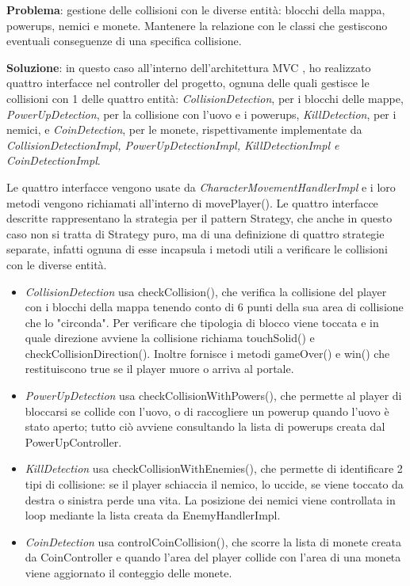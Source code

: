\documentclass[a4paper,12pt]{report}
\begin{document}
\textbf{Problema}: gestione delle collisioni con le diverse entità: blocchi della mappa, powerups, nemici e monete. 
Mantenere la relazione con le classi che gestiscono eventuali conseguenze di una specifica collisione.\vspace{1cm}

\textbf{Soluzione}: in questo caso all'interno dell'architettura MVC , ho realizzato quattro interfacce nel controller del progetto, 
ognuna delle quali gestisce le collisioni con 1 delle quattro entità: \emph{CollisionDetection}, per i blocchi delle mappe, \emph{PowerUpDetection}, 
per la collisione con l'uovo e i powerups, \emph{KillDetection}, per i nemici, e \emph{CoinDetection}, per le monete, 
rispettivamente implementate da \emph{CollisionDetectionImpl, PowerUpDetectionImpl, KillDetectionImpl e CoinDetectionImpl}.

Le quattro interfacce vengono usate da \emph{CharacterMovementHandlerImpl} e i loro metodi vengono richiamati all'interno di movePlayer().
Le quattro interfacce descritte rappresentano la strategia per il pattern Strategy, che anche in questo caso non si tratta di Strategy puro, 
ma di una definizione di quattro strategie separate, infatti ognuna di esse incapsula i metodi utili a verificare le collisioni con le 
diverse entità.

\begin{itemize}
    \item \emph{CollisionDetection} usa checkCollision(), che verifica la collisione del player con i blocchi della mappa tenendo conto di 6 punti 
    della sua area di collisione che lo "circonda". Per verificare che tipologia di blocco viene toccata e in quale direzione avviene
    la collisione richiama touchSolid() e checkCollisionDirection().
    Inoltre fornisce i metodi gameOver() e win() che restituiscono true se il player muore o arriva al portale.
    \item \emph{PowerUpDetection} usa checkCollisionWithPowers(), che permette al player di bloccarsi se collide con l'uovo, o di raccogliere un 
    powerup quando l'uovo è stato aperto; tutto ciò avviene consultando la lista di powerups creata dal PowerUpController.
    \item \emph{KillDetection} usa checkCollisionWithEnemies(), che permette di identificare 2 tipi di collisione: se il player schiaccia il nemico, 
    lo uccide, se viene toccato da destra o sinistra perde una vita. La posizione dei nemici viene controllata in loop mediante 
    la lista creata da EnemyHandlerImpl.
    \item \emph{CoinDetection} usa controlCoinCollision(), che scorre la lista di monete creata da CoinController e quando l'area del player collide 
    con l'area di una moneta viene aggiornato il conteggio delle monete.
\end{itemize}
\end{document}
